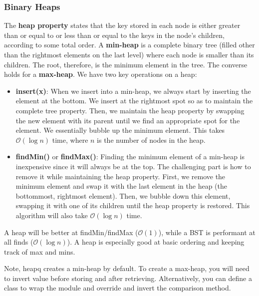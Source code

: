 \documentclass{article}
\newcommand{\bigO}{\mathcal{O}}
\begin{document}
    \subsubsection{Binary Heaps}
    The \textbf{heap property} states that the key stored in each node is either greater than or equal to or less than or equal to the keys in the node's children, according to some total order. A \textbf{min-heap} is a complete binary tree (filled other than the rightmost elements on the last level) where each node is smaller than its children. The root, therefore, is the minimum element in the tree. The converse holds for a \textbf{max-heap}. We have two key operations on a heap: 
    
    \begin{itemize}
        \item \textbf{insert(x)}: When we insert into a min-heap, we always start by inserting the element at the bottom. We insert at the rightmost spot so as to maintain the complete tree property. Then, we maintain the heap property by swapping the new element with its parent until we find an appropriate spot for the element. We essentially bubble up the minimum element. This takes $\bigO (\log n)$ time, where $n$ is the number of nodes in the heap. 
        
        \item \textbf{findMin()} or \textbf{findMax()}: Finding the minimum element of a min-heap is inexpensive since it will always be at the top. The challenging part is how to remove it while maintaining the heap property. First, we remove the minimum element and swap it with the last element in the heap (the bottommost, rightmost element). Then, we bubble down this element, swapping it with one of its children until the heap property is restored. This algorithm will also take $\bigO( \log n)$ time. 
    \end{itemize}
    
    A heap will be better at findMin/findMax ($\bigO(1)$), while a BST is performant at all finds ($\bigO(\log n)$). A heap is especially good at basic ordering and keeping track of max and mins.
    
    Note, heapq creates a min-heap by default. To create a max-heap, you will need to invert value before storing and after retrieving. Alternatively, you can define a class to wrap the module and override and invert the comparison method.
\end{document}
